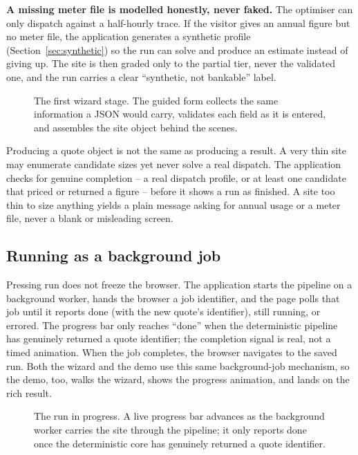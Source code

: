 \textbf{A missing meter file is modelled honestly, never faked.} The optimiser can only dispatch against a half-hourly trace. If the visitor gives an annual figure but no meter file, the application generates a synthetic profile (Section~\ref{sec:synthetic}) so the run can solve and produce an estimate instead of giving up. The site is then graded only to the partial tier, never the validated one, and the run carries a clear ``synthetic, not bankable'' label.

\begin{figure}[H]
\centering
{}
\caption{The first wizard stage. The guided form collects the same information a  JSON would carry, validates each field as it is entered, and assembles the site object behind the scenes.}
\label{fig:app-wizard}
\end{figure}

\begin{caution}
Producing a quote object is not the same as producing a result. A very thin site may enumerate candidate sizes yet never solve a real dispatch. The application checks for genuine completion -- a real dispatch profile, or at least one candidate that priced or returned a figure -- before it shows a run as finished. A site too thin to size anything yields a plain message asking for annual usage or a meter file, never a blank or misleading screen.
\end{caution}

\subsection{Running as a background job}

Pressing run does not freeze the browser. The application starts the pipeline on a background worker, hands the browser a job identifier, and the page polls that job until it reports done (with the new quote's identifier), still running, or errored. The progress bar only reaches ``done'' when the deterministic pipeline has genuinely returned a quote identifier; the completion signal is real, not a timed animation. When the job completes, the browser navigates to the saved run. Both the wizard and the demo use this same background-job mechanism, so the demo, too, walks the wizard, shows the progress animation, and lands on the rich result.

\begin{figure}[H]
\centering
{}
\caption{The run in progress. A live progress bar advances as the background worker carries the site through the pipeline; it only reports done once the deterministic core has genuinely returned a quote identifier.}
\label{fig:app-run}
\end{figure}

